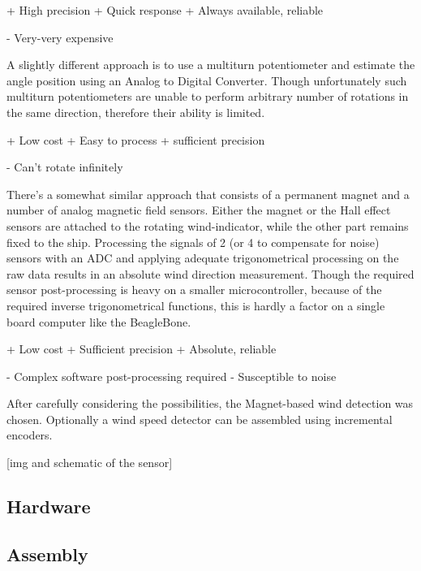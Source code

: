 + High precision
+ Quick response
+ Always available, reliable

- Very-very expensive

A slightly different approach is to use a multiturn potentiometer and estimate the angle position using an Analog to Digital Converter. Though unfortunately such multiturn potentiometers are unable to perform arbitrary number of rotations in the same direction, therefore their ability is limited.

+ Low cost
+ Easy to process
+ sufficient precision

- Can't rotate infinitely

There's a somewhat similar approach that consists of a permanent magnet and a number of analog magnetic field sensors. Either the magnet or the Hall effect sensors are attached to the rotating wind-indicator, while the other part remains fixed to the ship. Processing the signals of 2 (or 4 to compensate for noise) sensors with an ADC and applying adequate trigonometrical processing on the raw data results in an absolute wind direction measurement. Though the required sensor post-processing is heavy on a smaller microcontroller, because of the required inverse trigonometrical functions, this is hardly a factor on a single board computer like the BeagleBone.

+ Low cost
+ Sufficient precision
+ Absolute, reliable

- Complex software post-processing required
- Susceptible to noise

After carefully considering the possibilities, the Magnet-based wind detection was chosen. Optionally a wind speed detector can be assembled using incremental encoders.

[img and schematic of the sensor]

\subsection{Hardware}

\subsection{Assembly}